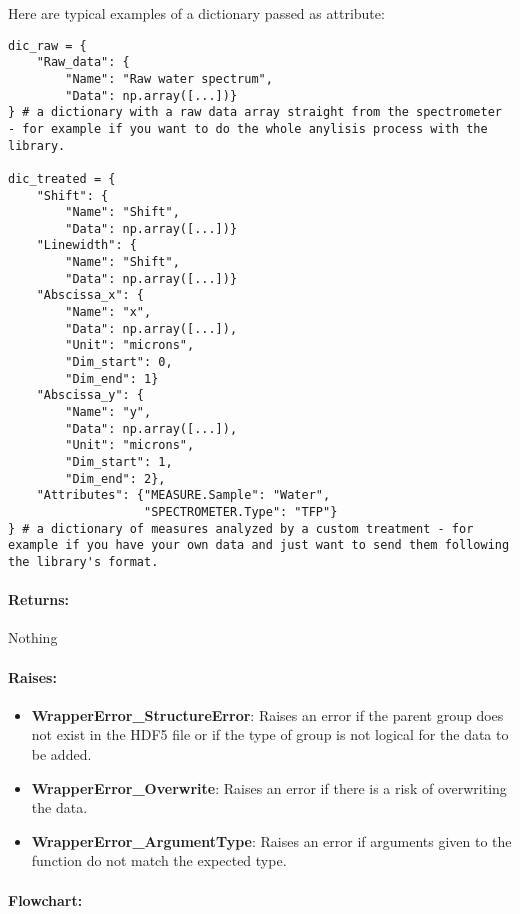 Here are typical examples of a dictionary passed as attribute:
\begin{lstlisting}
dic_raw = {
    "Raw_data": {
        "Name": "Raw water spectrum", 
        "Data": np.array([...])}
} # a dictionary with a raw data array straight from the spectrometer - for example if you want to do the whole anylisis process with the library.

dic_treated = {
    "Shift": {
        "Name": "Shift", 
        "Data": np.array([...])}
    "Linewidth": {
        "Name": "Shift", 
        "Data": np.array([...])}
    "Abscissa_x": {
        "Name": "x", 
        "Data": np.array([...]),
        "Unit": "microns",
        "Dim_start": 0,
        "Dim_end": 1}
    "Abscissa_y": {
        "Name": "y", 
        "Data": np.array([...]),
        "Unit": "microns",
        "Dim_start": 1,
        "Dim_end": 2},
    "Attributes": {"MEASURE.Sample": "Water",
                   "SPECTROMETER.Type": "TFP"}
} # a dictionary of measures analyzed by a custom treatment - for example if you have your own data and just want to send them following the library's format.
\end{lstlisting}

\paragraph*{Returns:} Nothing

\paragraph*{Raises:}

\begin{itemize}
    \item \textbf{WrapperError\_StructureError}: Raises an error if the parent group does not exist in the HDF5 file or if the type of group is not logical for the data to be added.
    \item \textbf{WrapperError\_Overwrite}: Raises an error if there is a risk of overwriting the data.
    \item \textbf{WrapperError\_ArgumentType}: Raises an error if arguments given to the function do not match the expected type.
\end{itemize}

\paragraph*{Flowchart:}

